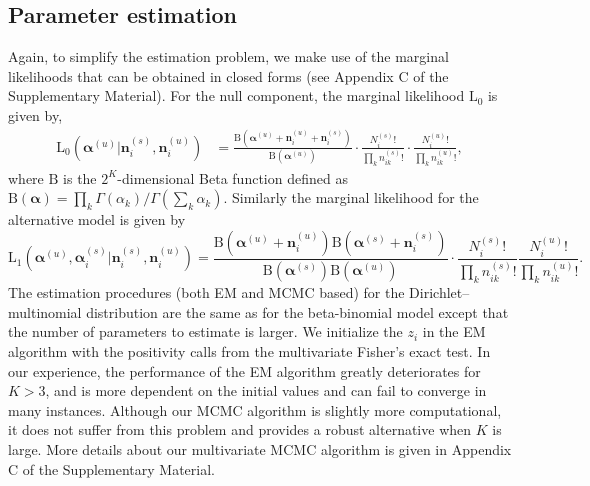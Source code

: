 \documentclass[12pt,oupdraft]{biostatistics}
\begin{document}
\subsection{Parameter estimation}
Again, to simplify the estimation problem, we make use of the marginal likelihoods that can be obtained in closed forms (see Appendix C of the Supplementary Material). For the null component, the marginal likelihood $\mathrm{L}_0$ is given by,
\begin{align*}
\mathrm{L}_0(\boldsymbol{\alpha}^{(u)}|\mathbf{n}^{(s)}_{i},\mathbf{n}^{(u)}_{i}) &= \frac{ \mathrm{B}(\boldsymbol{\alpha}^{(u)}+\mathbf{n}^{(u)}_{i}+\mathbf{n}^{(s)}_{i})}{\mathrm{B}(\boldsymbol{\alpha}^{(u)})} \cdot \frac{N^{(s)}_{i}!}{\prod_k n^{(s)}_{ik}!} \cdot \frac{N^{(u)}_{i}!}{\prod_k n^{(u)}_{ik}!},
\end{align*}
where $\mathrm{B}$ is the $2^K$-dimensional Beta function defined as $\mathrm{B}(\boldsymbol{\alpha})=\prod_k\Gamma(\alpha_k)/\Gamma(\sum_k\alpha_k)$. Similarly the marginal likelihood for the alternative model is given by
\[
\mathrm{L}_1(\boldsymbol{\alpha}^{(u)},\boldsymbol{\alpha}^{(s)}_{i}|\mathbf{n}^{(s)}_{i},\mathbf{n}^{(u)}_{i}) =\frac{\mathrm{B}(\boldsymbol{\alpha}^{(u)}+\mathbf{n}^{(u)}_{i}) \mathrm{B}(\boldsymbol{\alpha}^{(s)}+\mathbf{n}^{(s)}_{i})}{\mathrm{B}(\boldsymbol{\alpha}^{(s)})\mathrm{B}(\boldsymbol{\alpha}^{(u)})} \cdot \frac{N^{(s)}_{i}!}{\prod_k n^{(s)}_{ik}!} \frac{N^{(u)}_{i}!}{\prod_k n^{(u)}_{ik}!}.
\]
The estimation procedures (both EM and MCMC based) for the Dirichlet--multinomial distribution are the same as for the beta-binomial model except that the number of parameters to estimate is larger. We initialize the $z_i$ in the EM algorithm with the positivity calls from the multivariate Fisher's exact test. In our experience, the performance of the EM algorithm greatly deteriorates for $K>3$, and is more dependent on the initial values and can fail to converge in many instances. Although our MCMC algorithm is slightly more computational, it does not suffer from this problem and provides a robust alternative when $K$ is large. More details about our multivariate MCMC algorithm is given in Appendix C of the Supplementary Material.
\end{document}
